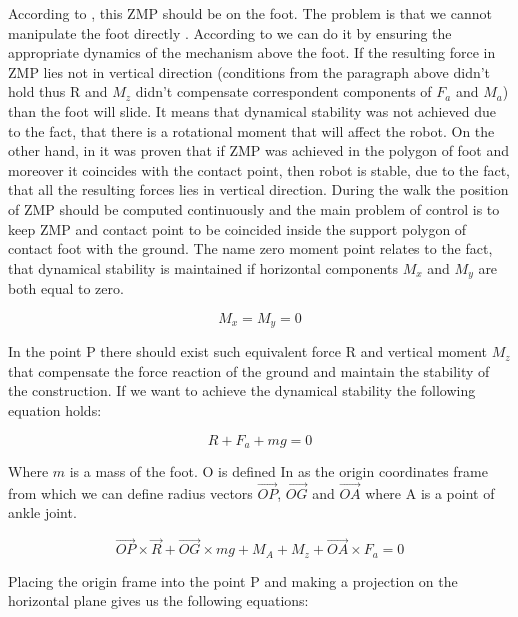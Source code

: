 \documentclass[12pt,a4paper]{report}
\begin{document}
		According to \cite{kajita2003biped}, this ZMP should be on the foot. The problem is that we cannot manipulate the foot directly \cite{mitobe2000control}. According to \cite{vukobratovic2004zero} we can do it by ensuring the appropriate dynamics of the mechanism above the foot. If the resulting force in ZMP lies not in vertical direction (conditions from the paragraph above didn't hold thus R and $M_z$ didn't compensate correspondent components of $F_a$ and $M_a$) than the foot will slide. It means that dynamical stability was not achieved due to the fact, that there is a rotational moment that will affect the robot. On the other hand, in \cite{sardain2004forces} it was proven that if ZMP was achieved in the polygon of foot and moreover it coincides with the contact point, then robot is stable, due to the fact, that all the resulting forces lies in vertical direction. During the walk the position of ZMP should be computed continuously and the main problem of control is to keep ZMP and contact point to be coincided inside the support polygon of contact foot with the ground.
		The name zero moment point relates to the fact, that dynamical stability is maintained if horizontal components $M_x$ and $M_y$ are both equal to zero.
	
		\begin{equation}\label{eq:ZMP1}
			M_x = M_y = 0
		\end{equation}

		In the point P there should exist such equivalent force R and vertical moment $M_z$ that compensate the force reaction of the ground and maintain the stability of the construction. If we want to achieve the dynamical stability the following equation holds:

		\begin{equation}\label{eq:ZMP2}
			R + F_a + mg = 0
		\end{equation}

		Where $m$ is a mass of the foot. O is defined In \cite{vukobratovic2004zero} as the origin coordinates frame from which we can define radius vectors $\vec{OP}$, $\vec{OG}$ and $\vec{OA}$ where A is a point of ankle joint.

		\begin{equation}\label{eq:ZMP3}
			\vec{OP} \times \vec{R} + \vec{OG} \times mg + M_A + M_z + \vec{OA} \times F_a = 0
		\end{equation}

		Placing the origin frame into the point P and making a projection on the horizontal plane gives us the following equations: 
\end{document}
